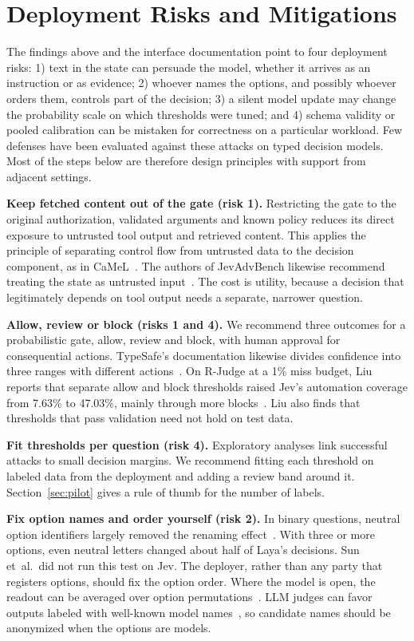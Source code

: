 \section{Deployment Risks and Mitigations}
\label{sec:risks}

The findings above and the interface documentation point to four deployment risks: 1) text in the state can persuade the model, whether it arrives as an instruction or as evidence; 2) whoever names the options, and possibly whoever orders them, controls part of the decision; 3) a silent model update may change the probability scale on which thresholds were tuned; and 4) schema validity or pooled calibration can be mistaken for correctness on a particular workload. Few defenses have been evaluated against these attacks on typed decision models. Most of the steps below are therefore design principles with support from adjacent settings.

\noindent\textbf{Keep fetched content out of the gate (risk 1).} Restricting the gate to the original authorization, validated arguments and known policy reduces its direct exposure to untrusted tool output and retrieved content. This applies the principle of separating control flow from untrusted data to the decision component, as in CaMeL~\cite{debenedetti2025defeating}. The authors of JevAdvBench likewise recommend treating the state as untrusted input~\cite{hu2026jevadvbench}. The cost is utility, because a decision that legitimately depends on tool output needs a separate, narrower question.

\noindent\textbf{Allow, review or block (risks 1 and 4).} We recommend three outcomes for a probabilistic gate, allow, review and block, with human approval for consequential actions. TypeSafe's documentation likewise divides confidence into three ranges with different actions~\cite{typesafe2026docs}. On R-Judge at a 1\% miss budget, Liu reports that separate allow and block thresholds raised Jev's automation coverage from 7.63\% to 47.03\%, mainly through more blocks~\cite{liu2026evaluating}. Liu also finds that thresholds that pass validation need not hold on test data.

\noindent\textbf{Fit thresholds per question (risk 4).} Exploratory analyses link successful attacks to small decision margins. We recommend fitting each threshold on labeled data from the deployment and adding a review band around it. Section~\ref{sec:pilot} gives a rule of thumb for the number of labels.

\noindent\textbf{Fix option names and order yourself (risk 2).} In binary questions, neutral option identifiers largely removed the renaming effect~\cite{sun2026type}. With three or more options, even neutral letters changed about half of Laya's decisions. Sun et~al.\ did not run this test on Jev. The deployer, rather than any party that registers options, should fix the option order. Where the model is open, the readout can be averaged over option permutations~\cite{zheng2024large}. LLM judges can favor outputs labeled with well-known model names~\cite{gu2024survey}, so candidate names should be anonymized when the options are models.

